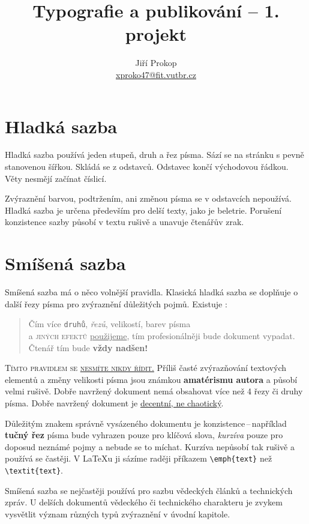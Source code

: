 \documentclass[10pt, twocolumn]{article}
\title{Typografie a publikování – 1. projekt}
\author{Jiří Prokop \\ \href{mailto:xproko47@fit.vutbr.cz}{xproko47@fit.vutbr.cz}}
\date{}
\begin{document}
\maketitle


\section{Hladká sazba}
Hladká sazba používá jeden stupeň, druh a řez písma. Sází
se na stránku s pevně stanovenou šířkou. Skládá se z odstavců. Odstavec končí východovou řádkou. Věty nesmějí
začínat číslicí.

Zvýraznění barvou, podtržením, ani změnou písma se
v odstavcích nepoužívá. Hladká sazba je určena především
pro delší texty, jako je beletrie. Porušení konzistence sazby
působí v textu rušivě a unavuje čtenářův zrak.

\section{Smíšená sazba}
Smíšená sazba má o něco volnější pravidla. Klasická hladká
sazba se doplňuje o další řezy písma pro zvýraznění důležitých pojmů. Existuje :

\begin{quotation}
Čím více \texttt{druhů}, \emph{řezů}, {\tiny velikostí}, {\color{green} barev} písma\\
a \textsc{\color{blue} jiných efektů} \underline{použijeme}, {\color{red} tím profesionál\-něji} bude 
{\selectfont dokument} vypadat. Čtenář tím bude \textbf{\fontsize{27pt}{0pt} \selectfont vždy nadšen!}
\end{quotation}

\textsc{Tímto pravidlem se \underline{nesmíte nikdy řídit.}} Příliš
časté zvýrazňování textových elementů a změny {\footnotesize velikosti} 
písma jsou známkou \textbf{amatérismu autora} a působí {\selectfont velmi
rušivě}. Dobře navržený dokument nemá obsahovat více
než 4 řezy či druhy písma. Dobře navržený dokument je
\underline{decentní, ne chaotický}.

Důležitým znakem správně vysázeného dokumentu je
konzistence\,--\,například \textbf{tučný řez} písma bude vyhrazen
pouze pro klíčová slova, \emph{kurzíva} pouze pro doposud neznámé pojmy a nebude se to míchat. Kurzíva nepůsobí
tak rušivě a používá se častěji. V \LaTeX u ji sázíme raději
příkazem \verb|\emph{text}| než \verb|\textit{text}|.

Smíšená sazba se nejčastěji používá pro sazbu vědeckých článků a technických zpráv. U delších dokumentů
vědeckého či technického charakteru je zvykem vysvětlit
význam různých typů zvýraznění v úvodní kapitole.
\end{document}

